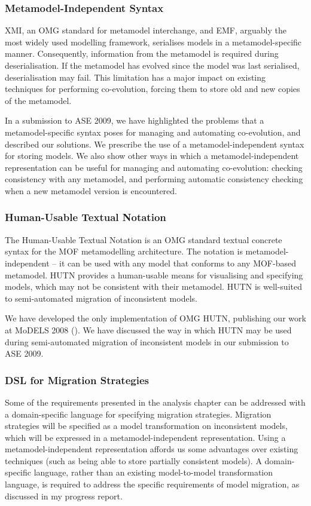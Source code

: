 \subsubsection{Metamodel-Independent Syntax}
XMI, an OMG standard for metamodel interchange, and EMF, arguably the most widely used modelling framework, serialises models in a metamodel-specific manner. Consequently, information from the metamodel is required during deserialisation. If the metamodel has evolved since the model was last serialised, deserialisation may fail. This limitation has a major impact on existing techniques for performing co-evolution, forcing them to store old and new copies of the metamodel. 

In a submission to ASE 2009, we have highlighted the problems that a metamodel-specific syntax poses for managing and automating co-evolution, and described our solutions. We prescribe the use of a metamodel-independent syntax for storing models. We also show other ways in which a metamodel-independent representation can be useful for managing and automating co-evolution: checking consistency with any metamodel, and performing automatic consistency checking when a new metamodel version is encountered.

\subsubsection{Human-Usable Textual Notation}
The Human-Usable Textual Notation is an OMG standard textual concrete syntax for the MOF metamodelling architecture. The notation is metamodel-independent -- it can be used with any model that conforms to any MOF-based metamodel. HUTN provides a human-usable means for visualising and specifying models, which may not be consistent with their metamodel. HUTN is well-suited to semi-automated migration of inconsistent models.

We have developed the only implementation of OMG HUTN, publishing our work at MoDELS 2008 (\cite{rose08hutn}). We have discussed the way in which HUTN may be used during semi-automated migration of inconsistent models in our submission to ASE 2009.

\subsubsection{DSL for Migration Strategies}
Some of the requirements presented in the analysis chapter can be addressed with a domain-specific language for specifying migration strategies. Migration strategies will be specified as a model transformation on inconsistent models, which will be expressed in a metamodel-independent representation. Using a metamodel-independent representation affords us some advantages over existing techniques (such as being able to store partially consistent models). A domain-specific language, rather than an existing model-to-model transformation language, is required to address the specific requirements of model migration, as discussed in my progress report.


